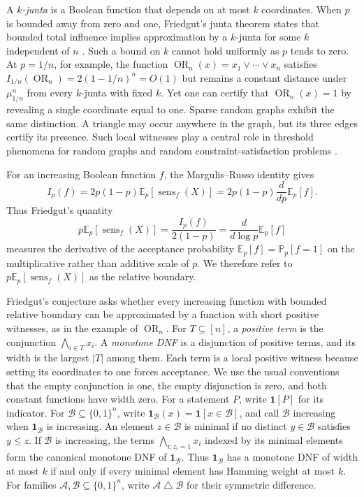 \documentclass[11pt,letterpaper]{article}
\theoremstyle{definition}
\theoremstyle{remark}
\newcommand{\bits}{\{0,1\}}
\newcommand{\E}{\mathbb E}
\renewcommand{\Pr}{\mathbb P}
\newcommand{\one}{\mathbf 1}
\newcommand{\sens}{\operatorname{sens}}
\newcommand{\cA}{\mathcal A}
\newcommand{\cB}{\mathcal B}
\begin{document}
A \emph{$k$-junta} is a Boolean function that depends on at most $k$
coordinates.  When $p$ is bounded away from zero and one, Friedgut's junta
theorem states that bounded total influence implies approximation by a
$k$-junta for some $k$ independent of $n$ \cite{Friedgut1998}.  Such a bound
on $k$ cannot hold uniformly as $p$ tends to zero.  At $p=1/n$, for example, the
function $\operatorname{OR}_n(x)=x_1\vee\cdots\vee x_n$ satisfies
$I_{1/n}(\operatorname{OR}_n)=2(1-1/n)^n=O(1)$ but remains a constant distance
under $\mu_{1/n}^n$ from every $k$-junta with fixed $k$.  Yet one can certify that
$\operatorname{OR}_n(x)=1$ by revealing a single coordinate equal to one.
Sparse random graphs exhibit the same distinction.  A triangle may occur
anywhere in the graph, but its three edges certify its presence.
Such local witnesses play a central role in threshold
phenomena for random graphs and random constraint-satisfaction problems
\cite{FriedgutKalai1996,Friedgut1999}.

For an increasing Boolean function $f$, the Margulis--Russo identity
\cite{Margulis1974,Russo1981} gives
\begin{equation}
\label{eq:intro-margulis-russo}
  I_p(f)=2p(1-p)\E_p[\sens_f(X)]
  =2p(1-p)\frac{d}{dp}\E_p[f].
\end{equation}
Thus Friedgut's quantity
\[
  p\E_p[\sens_f(X)]
  =\frac{I_p(f)}{2(1-p)}
  =\frac{d}{d\log p}\E_p[f]
\]
measures the derivative of the acceptance probability $\E_p[f]=\Pr_p[f=1]$
on the multiplicative rather than additive scale of $p$.  We therefore refer
to $p\E_p[\sens_f(X)]$ as the relative boundary.

Friedgut's conjecture asks whether every increasing function with bounded
relative boundary can be approximated by a function with short positive
witnesses, as in the example of $\operatorname{OR}_n$.  For
$T\subseteq[n]$, a \emph{positive term} is the conjunction
$\bigwedge_{i\in T}x_i$.  A \emph{monotone DNF} is a disjunction of positive
terms, and its width is the largest $|T|$ among them.  Each term is a local
positive witness because setting its coordinates to one forces acceptance.
We use the usual conventions that the empty conjunction is one, the empty
disjunction is zero, and both constant functions have width zero.
For a statement $P$, write $\one[P]$ for its indicator.  For
$\cB\subseteq\bits^n$, write $\one_{\cB}(x)=\one[x\in\cB]$, and call $\cB$
increasing when $\one_{\cB}$ is increasing.  An element $z\in\cB$ is
minimal if no distinct $y\in\cB$ satisfies $y\le z$.  If $\cB$ is increasing,
the terms $\bigwedge_{i:z_i=1}x_i$ indexed by its minimal elements form the
canonical monotone DNF of $\one_{\cB}$.  Thus $\one_{\cB}$ has a monotone DNF
of width at most $k$ if and only if every minimal element has Hamming weight
at most $k$.  For families
$\cA,\cB\subseteq\bits^n$, write $\cA\mathbin\triangle\cB$ for their symmetric
difference.
\end{document}
